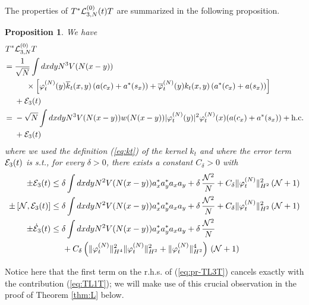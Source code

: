 \documentclass[11pt,a4paper,DIV11]{scrartcl}	%
\newtheorem{proposition}[thm]{Proposition}
\newcommand{\cE}{{\cal E}}
\newcommand{\cL}{{\cal L}}
\newcommand{\cN}{{\cal N}}
\begin{document}
The properties of $T^* \cL_{3,N}^{(0)} (t) T$ are summarized in the following proposition. 
\begin{proposition}\label{prop:TL3T}
We have
\begin{equation}\label{eq:pr-TL3T} \begin{split} T^* &\cL^{(0)}_{3,N} T \\ =  \; & \frac{1}{\sqrt{N}} 
\int dx dy N^3 V (N (x-y))  \\ & \hspace{.5cm} \times \left[ \varphi_t^{(N)} (y) \overline{k}_t (x,y)  \left( a (c_x) + a^* (s_x) \right)   + \overline{\varphi}_t^{(N)} (y) k_t (x,y)  \left( a^* (c_x) + a (s_x) \right)  \right] \\ &+ \cE_3 (t) \\
= \; &- \sqrt{N} \int dx dy N^3 V(N (x-y)) w(N (x-y)) |\varphi_t^{(N)} (y)|^2 \varphi_t^{(N)} (x) (a (c_x) + a^* (s_x)) + \text{h.c.} \\ &+ \cE_3 (t)
\end{split} \end{equation}
where we used the definition (\ref{eq:kt}) of the kernel $k_t$ and where the error term $\cE_3 (t)$ is s.t., for every $\delta > 0$, there exists a constant $C_\delta > 0$ with
\begin{equation}\label{eq:TL3T-cl}
\begin{split} \pm \cE_3 (t)  &\leq \delta \int dx dy N^2 V (N (x-y)) a_x^* a_y^* a_x a_y + \delta \,\frac{\cN^2}{N} + C_\delta \| \varphi_t^{(N)} \|_{H^2}^2 \left(\cN + 1\right) \\
\pm \left[ \cN , \cE_3 (t) \right] &\leq \delta \int dx dy N^2 V (N (x-y)) a_x^* a_y^* a_x a_y + \delta \,  \frac{\cN^2}{N} + C_\delta  \| \varphi_t^{(N)} \|_{H^2}^2  \left(\cN + 1\right) \\
\pm \dot{\cE}_3 (t) & \leq \delta \int dx dy N^2 V (N (x-y)) a_x^* a_y^* a_x a_y + \delta \, \frac{\cN^2}{N} 
\\ & \hspace{.5cm} + C_\delta \left( \| \varphi_t^{(N)} \|_{H^4}^2 \| \varphi_t^{(N)} \|_{H^2}^2 + \| \varphi_t^{(N)} \|_{H^2}^4 \right) \,  \left( \cN + 1\right)
\end{split} \end{equation}
\end{proposition}

Notice here that the first term on the r.h.s. of (\ref{eq:pr-TL3T}) cancels exactly with the contribution (\ref{eq:TL1T}); we will make use of this crucial observation in the proof of Theorem \ref{thm:L} below.
\end{document}
